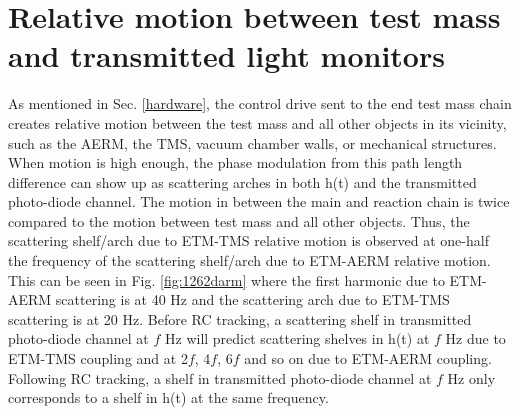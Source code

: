 \documentclass[12pt]{iopart}
\begin{document}
\section{Relative motion between test mass and transmitted light monitors} \label{transmon_scattering}
As mentioned in Sec. \ref{hardware}, the control drive sent to the end test mass chain creates relative motion between the test mass and all other objects in its vicinity, such as the AERM, the TMS, vacuum chamber walls, or mechanical structures. When motion is high enough, the phase modulation from this path length difference can show up as scattering arches in both h(t) and the transmitted photo-diode channel. The motion in between the main and reaction chain is twice compared to the motion between test mass and all other objects. Thus, the scattering shelf/arch due to ETM-TMS relative motion is observed at one-half the frequency of the scattering shelf/arch due to ETM-AERM relative motion. This can be seen in Fig. \ref{fig:1262darm} where the first harmonic due to ETM-AERM scattering is at 40 Hz and the scattering arch due to ETM-TMS scattering is at 20 Hz. Before RC tracking, a scattering shelf in transmitted photo-diode channel at $f$ Hz will predict scattering shelves in h(t) at $f$ Hz due to ETM-TMS coupling and at 2$f$, 4$f$, 6$f$ and so on due to ETM-AERM coupling. Following RC tracking, a shelf in transmitted photo-diode channel at $f$ Hz only corresponds to a shelf in h(t) at the same frequency.
\par
 
\end{document}
